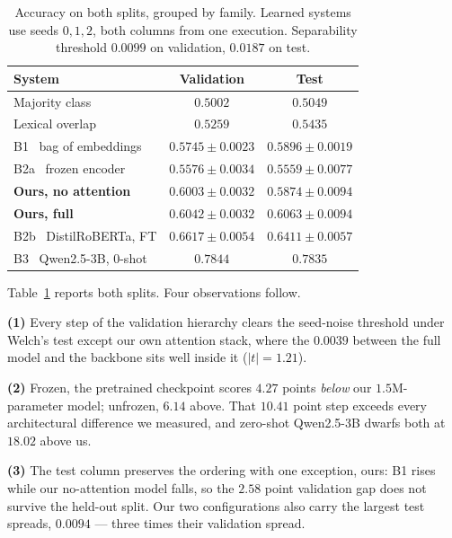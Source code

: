 \documentclass[11pt]{article}
\begin{document}
\begin{table}[tb]
  \centering\small
  \setlength{\tabcolsep}{2.5pt}
  \begin{tabular}{@{}lcc@{}}
    \toprule
    \textbf{System} & \textbf{Validation} & \textbf{Test}\\
    \midrule
    Majority class & $0.5002$ & $0.5049$\\
    Lexical overlap & $0.5259$ & $0.5435$\\
    \midrule
    B1 \ bag of embeddings & $0.5745 \pm 0.0023$ & $0.5896 \pm 0.0019$\\
    B2a \ frozen encoder & $0.5576 \pm 0.0034$ & $0.5559 \pm 0.0077$\\
    \midrule
    \rowcolor{ourrow}
    \textbf{Ours, no attention} & $0.6003 \pm 0.0032$ & $0.5874 \pm 0.0094$\\
    \rowcolor{ourrow}
    \textbf{Ours, full} & $0.6042 \pm 0.0032$ & $\mathbf{0.6063 \pm 0.0094}$\\
    \midrule
    B2b \ DistilRoBERTa, FT & $0.6617 \pm 0.0054$ & $0.6411 \pm 0.0057$\\
    B3 \ Qwen2.5-3B, 0-shot & $0.7844$ & $0.7835$\\
    \bottomrule
  \end{tabular}
  \caption{Accuracy on both splits, grouped by family. Learned systems use
  seeds $0,1,2$, both columns from one execution. Separability threshold
  $0.0099$ on validation, $0.0187$ on test.}
  \label{tab:overall}
\end{table}

Table~\ref{tab:overall} reports both splits. Four observations follow.

\textbf{(1)} Every step of the validation hierarchy clears the seed-noise
threshold under Welch's test except our own attention stack, where the
$0.0039$ between the full model and the backbone sits well inside it
($|t| = 1.21$).

\textbf{(2)} Frozen, the pretrained checkpoint scores $4.27$ points
\emph{below} our $1.5$M-parameter model; unfrozen, $6.14$ above. That $10.41$
point step exceeds every architectural difference we measured, and zero-shot
Qwen2.5-3B dwarfs both at $18.02$ above us.

\textbf{(3)} The test column preserves the ordering with one exception, ours:
B1 rises while our no-attention model falls, so the $2.58$ point validation
gap does not survive the held-out split. Our two configurations also carry the
largest test spreads, $0.0094$ --- three times their validation spread.
\end{document}
